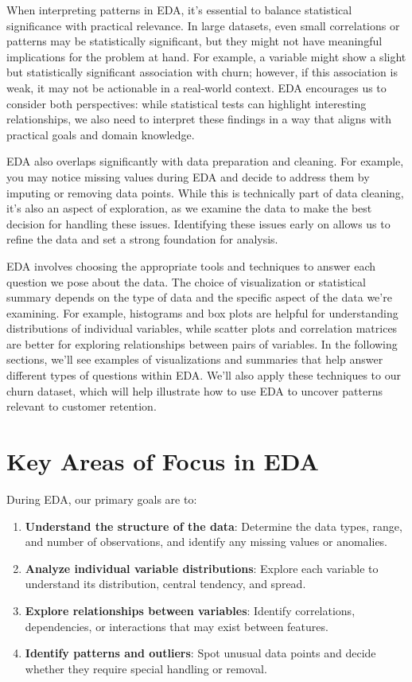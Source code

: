 \documentclass[
]{book}
\providecommand{\tightlist}{%
  \setlength{\itemsep}{0pt}\setlength{\parskip}{0pt}}
\theoremstyle{definition}
\theoremstyle{definition}
\theoremstyle{definition}
\theoremstyle{definition}
\theoremstyle{remark}
\begin{document}
When interpreting patterns in EDA, it's essential to balance statistical significance with practical relevance. In large datasets, even small correlations or patterns may be statistically significant, but they might not have meaningful implications for the problem at hand. For example, a variable might show a slight but statistically significant association with churn; however, if this association is weak, it may not be actionable in a real-world context. EDA encourages us to consider both perspectives: while statistical tests can highlight interesting relationships, we also need to interpret these findings in a way that aligns with practical goals and domain knowledge.

EDA also overlaps significantly with data preparation and cleaning. For example, you may notice missing values during EDA and decide to address them by imputing or removing data points. While this is technically part of data cleaning, it's also an aspect of exploration, as we examine the data to make the best decision for handling these issues. Identifying these issues early on allows us to refine the data and set a strong foundation for analysis.

EDA involves choosing the appropriate tools and techniques to answer each question we pose about the data. The choice of visualization or statistical summary depends on the type of data and the specific aspect of the data we're examining. For example, histograms and box plots are helpful for understanding distributions of individual variables, while scatter plots and correlation matrices are better for exploring relationships between pairs of variables. In the following sections, we'll see examples of visualizations and summaries that help answer different types of questions within EDA. We'll also apply these techniques to our churn dataset, which will help illustrate how to use EDA to uncover patterns relevant to customer retention.

\section{Key Areas of Focus in EDA}\label{key-areas-of-focus-in-eda}

During EDA, our primary goals are to:

\begin{enumerate}
\def\labelenumi{\arabic{enumi}.}
\tightlist
\item
  \textbf{Understand the structure of the data}: Determine the data types, range, and number of observations, and identify any missing values or anomalies.
\item
  \textbf{Analyze individual variable distributions}: Explore each variable to understand its distribution, central tendency, and spread.
\item
  \textbf{Explore relationships between variables}: Identify correlations, dependencies, or interactions that may exist between features.
\item
  \textbf{Identify patterns and outliers}: Spot unusual data points and decide whether they require special handling or removal.
\end{enumerate}
\end{document}
